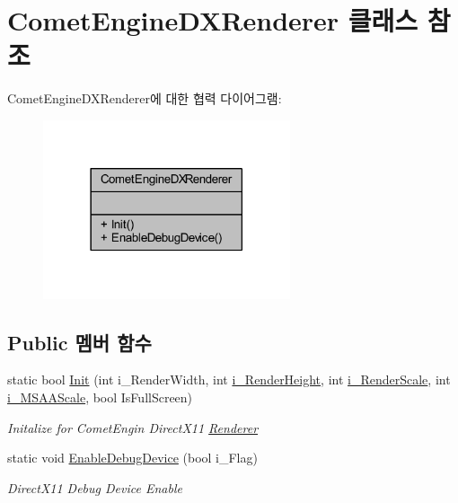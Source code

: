 \hypertarget{class_comet_engine_1_1_client_1_1_comet_engine_d_x_renderer}{}\section{Comet\+Engine\+D\+X\+Renderer 클래스 참조}
\label{class_comet_engine_1_1_client_1_1_comet_engine_d_x_renderer}


Comet\+Engine\+D\+X\+Renderer에 대한 협력 다이어그램\+:\nopagebreak
\begin{figure}[H]
\begin{center}
\leavevmode
\includegraphics[width=206pt]{class_comet_engine_1_1_client_1_1_comet_engine_d_x_renderer__coll__graph}
\end{center}
\end{figure}
\subsection*{Public 멤버 함수}
\begin{DoxyCompactItemize}
\item 
static bool \hyperlink{class_comet_engine_1_1_client_1_1_comet_engine_d_x_renderer_a43593e265ce79b6ab88f4384039eacc7}{Init} (int i\+\_\+\+Render\+Width, int \hyperlink{_d_l_l_comet_engine_renderer_8cpp_ab996e2b2e12adfc087c67cebde9194e6}{i\+\_\+\+Render\+Height}, int \hyperlink{_d_l_l_comet_engine_renderer_8cpp_a901222d6138bd4efc54d4eda8460c65b}{i\+\_\+\+Render\+Scale}, int \hyperlink{_d_l_l_comet_engine_renderer_8cpp_a7016fffcce13da83a94427468f9bf950}{i\+\_\+\+M\+S\+A\+A\+Scale}, bool Is\+Full\+Screen)
\begin{DoxyCompactList}\small\item\em Initalize for Comet\+Engin Direct\+X11 \hyperlink{namespace_comet_engine_1_1_renderer}{Renderer} \end{DoxyCompactList}\item 
static void \hyperlink{class_comet_engine_1_1_client_1_1_comet_engine_d_x_renderer_a8385160d1bc564a68d4211dda3015d46}{Enable\+Debug\+Device} (bool i\+\_\+\+Flag)
\begin{DoxyCompactList}\small\item\em Direct\+X11 Debug Device Enable \end{DoxyCompactList}\end{DoxyCompactItemize}



